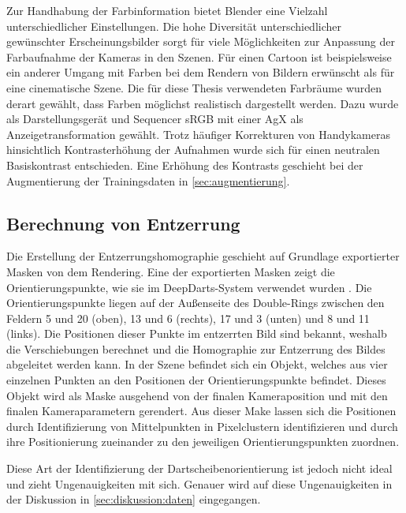 Zur Handhabung der Farbinformation bietet Blender eine Vielzahl unterschiedlicher Einstellungen. Die hohe Diversität unterschiedlicher gewünschter Erscheinungsbilder sorgt für viele Möglichkeiten zur Anpassung der Farbaufnahme der Kameras in den Szenen. Für einen Cartoon ist beispielsweise ein anderer Umgang mit Farben bei dem Rendern von Bildern erwünscht als für eine cinematische Szene. Die für diese Thesis verwendeten Farbräume wurden derart gewählt, dass Farben möglichst realistisch dargestellt werden. Dazu wurde als Darstellungsgerät und Sequencer sRGB mit einer AgX als Anzeigetransformation gewählt. Trotz häufiger Korrekturen von Handykameras hinsichtlich Kontrasterhöhung der Aufnahmen wurde sich für einen neutralen Basiskontrast entschieden. Eine Erhöhung des Kontrasts geschieht bei der Augmentierung der Trainingsdaten in \autoref{sec:augmentierung}.

\subsection{Berechnung von Entzerrung}  %
\label{sec:berechnung_entzerrung}

Die Erstellung der Entzerrungshomographie geschieht auf Grundlage exportierter Masken von dem Rendering. Eine der exportierten Masken zeigt die Orientierungspunkte, wie sie im DeepDarts-System verwendet wurden \cite{deepdarts}. Die Orientierungspunkte liegen auf der Außenseite des Double-Rings zwischen den Feldern 5 und 20 (oben), 13 und 6 (rechts), 17 und 3 (unten) und 8 und 11 (links). Die Positionen dieser Punkte im entzerrten Bild sind bekannt, weshalb die Verschiebungen berechnet und die Homographie zur Entzerrung des Bildes abgeleitet werden kann. In der Szene befindet sich ein Objekt, welches aus vier einzelnen Punkten an den Positionen der Orientierungspunkte befindet. Dieses Objekt wird als Maske ausgehend von der finalen Kameraposition und mit den finalen Kameraparametern gerendert. Aus dieser Make lassen sich die Positionen durch Identifizierung von Mittelpunkten in Pixelclustern identifizieren und durch ihre Positionierung zueinander zu den jeweiligen Orientierungspunkten zuordnen.

Diese Art der Identifizierung der Dartscheibenorientierung ist jedoch nicht ideal und zieht Ungenauigkeiten mit sich. Genauer wird auf diese Ungenauigkeiten in der Diskussion in \autoref{sec:diskussion:daten} eingegangen.
